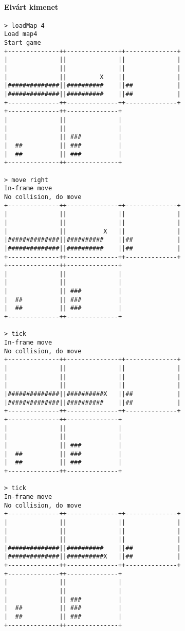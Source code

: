 		        \paragraph*{Elvárt kimenet}
\begin{verbatim}
> loadMap 4
Load map4
Start game
+--------------++--------------++--------------+
|              ||              ||              |
|              ||              ||              |
|              ||         X    ||              |
|##############||##########    ||##            |
|##############||##########    ||##            |
+--------------++--------------++--------------+
+--------------++--------------+                
|              ||              |                
|              ||              |                
|              || ###          |                
|  ##          || ###          |                
|  ##          || ###          |                
+--------------++--------------+                

> move right
In-frame move
No collision, do move
+--------------++--------------++--------------+
|              ||              ||              |
|              ||              ||              |
|              ||          X   ||              |
|##############||##########    ||##            |
|##############||##########    ||##            |
+--------------++--------------++--------------+
+--------------++--------------+                
|              ||              |                
|              ||              |                
|              || ###          |                
|  ##          || ###          |                
|  ##          || ###          |                
+--------------++--------------+                

> tick
In-frame move
No collision, do move
+--------------++--------------++--------------+
|              ||              ||              |
|              ||              ||              |
|              ||              ||              |
|##############||##########X   ||##            |
|##############||##########    ||##            |
+--------------++--------------++--------------+
+--------------++--------------+                
|              ||              |                
|              ||              |                
|              || ###          |                
|  ##          || ###          |                
|  ##          || ###          |                
+--------------++--------------+                

> tick
In-frame move
No collision, do move
+--------------++--------------++--------------+
|              ||              ||              |
|              ||              ||              |
|              ||              ||              |
|##############||##########    ||##            |
|##############||##########X   ||##            |
+--------------++--------------++--------------+
+--------------++--------------+                
|              ||              |                
|              ||              |                
|              || ###          |                
|  ##          || ###          |                
|  ##          || ###          |                
+--------------++--------------+                


\end{verbatim}

